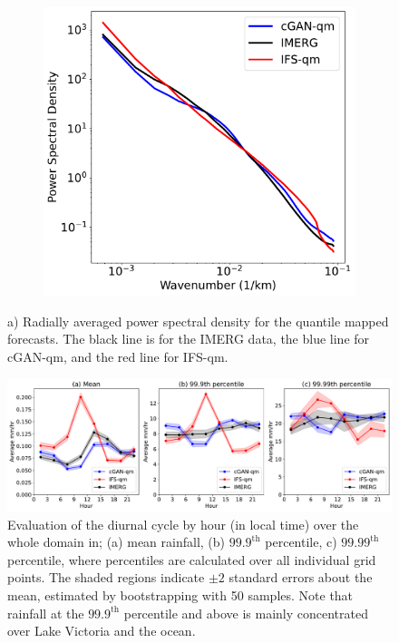\documentclass{article}
\begin{document}
\begin{figure}
     \centering
     \begin{subfigure}{0.48\textwidth}
     \includegraphics[width=\textwidth]{images/rapsd_final-nologs_217600.pdf}
     \caption{}
     \end{subfigure}
     
     \caption{a) Radially averaged power spectral density for the quantile mapped forecasts. The black line is for the IMERG data, the blue line for cGAN-qm, and the red line for IFS-qm. 
}
     \label{fig:rapsd}
\end{figure}


\begin{figure}
    \includegraphics[width=\textwidth]{images/diurnal_cycle_final-nologs_217600.pdf}
    \centering
     \caption{Evaluation of the diurnal cycle by hour (in local time) over the whole domain in; (a) mean rainfall, (b) $99.9^{\text{th}}$ percentile, c) $99.99^{\text{th}}$ percentile, where percentiles are calculated over all individual grid points. The shaded regions indicate $\pm2$ standard errors about the mean, estimated by bootstrapping with 50 samples. Note that rainfall at the $99.9^{\text{th}}$ percentile and above is mainly concentrated over Lake Victoria and the ocean.}
     \label{fig:diurnal}
\end{figure}
\end{document}
